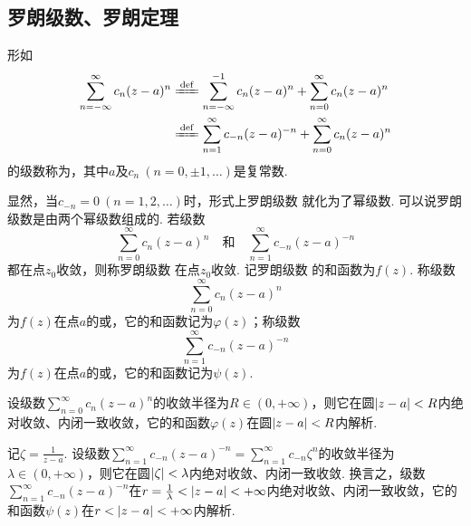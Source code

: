 \subsection{罗朗级数、罗朗定理}
\begin{definition}
形如\begin{equation}\label{equation:解析函数的级数表示.罗朗级数}
\begin{split}
\sum\limits_{n=-\infty}^{\infty} c_n (z-a)^n
&\defeq \sum\limits_{n=-\infty}^{-1} c_n (z-a)^n + \sum\limits_{n=0}^{\infty} c_n (z-a)^n \\
&\defeq \sum\limits_{n=1}^{\infty} c_{-n} (z-a)^{-n} + \sum\limits_{n=0}^{\infty} c_n (z-a)^n
\end{split}
\end{equation}的级数称为，其中\(a\)及\(c_n\ (n=0,\pm1,\dotsc)\)是复常数.
\end{definition}
显然，当\(c_{-n}=0\ (n=1,2,\dotsc)\)时，形式上罗朗级数  就化为了幂级数.
可以说罗朗级数是由两个幂级数组成的.
若级数\[
\sum\limits_{n=0}^{\infty} c_n (z-a)^n
\quad\text{和}\quad
\sum\limits_{n=1}^{\infty} c_{-n} (z-a)^{-n}
\]都在点\(z_0\)收敛，则称罗朗级数  在点\(z_0\)收敛.
记罗朗级数  的和函数为\(f(z)\).
称级数\[
\sum\limits_{n=0}^{\infty} c_n (z-a)^n
\]为\(f(z)\)在点\(a\)的或，它的和函数记为\(\varphi(z)\)；称级数\[
\sum\limits_{n=1}^{\infty} c_{-n} (z-a)^{-n}
\]为\(f(z)\)在点\(a\)的或，它的和函数记为\(\psi(z)\).

设级数\(\sum\limits_{n=0}^{\infty} c_n (z-a)^n\)的收敛半径为\(R \in (0,+\infty)\)，则它在圆\(\abs{z-a}<R\)内绝对收敛、内闭一致收敛，它的和函数\(\varphi(z)\)在圆\(\abs{z-a}<R\)内解析.

记\(\zeta = \frac{1}{z-a}\).
设级数\(\sum\limits_{n=1}^{\infty} c_{-n} (z-a)^{-n} = \sum\limits_{n=1}^{\infty} c_{-n} \zeta^n\)的收敛半径为\(\lambda \in (0,+\infty)\)，则它在圆\(\abs{\zeta} < \lambda\)内绝对收敛、内闭一致收敛.
换言之，级数\(\sum\limits_{n=1}^{\infty} c_{-n} (z-a)^{-n}\)在\(r = \frac{1}{\lambda} < \abs{z-a} < +\infty\)内绝对收敛、内闭一致收敛，它的和函数\(\psi(z)\)在\(r < \abs{z-a} < +\infty\)内解析.

